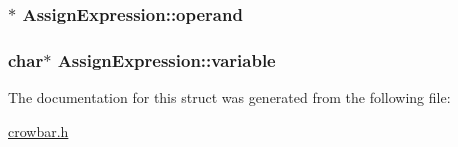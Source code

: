 \subsubsection[{operand}]{$\ast$ Assign\+Expression\+::operand}\label{struct_assign_expression_ae2bc8d22ef9baa0b02a484c3284559a6}
\hypertarget{struct_assign_expression_a0f54a893d9f786a38c10c166caa7dd08}{}
\subsubsection[{variable}]{\setlength{\rightskip}{0pt plus 5cm}char$\ast$ Assign\+Expression\+::variable}\label{struct_assign_expression_a0f54a893d9f786a38c10c166caa7dd08}


The documentation for this struct was generated from the following file\+:\begin{DoxyCompactItemize}
\item 
\hyperlink{crowbar_8h}{crowbar.\+h}\end{DoxyCompactItemize}
